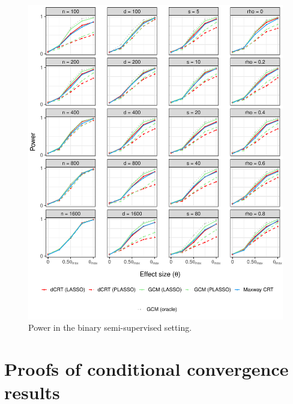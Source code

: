 \documentclass[aos]{imsart}
\theoremstyle{plain}
\theoremstyle{remark}
\begin{document}
\begin{figure}[!ht]
	\centering
	\includegraphics[width = \textwidth]{figures/binomial_semi_supervised_setting_alternative.pdf}
	\caption{Power in the binary semi-supervised setting.}
	\label{fig:binomial_semi-supervised_alternative}
\end{figure}



\clearpage

\section{Proofs of conditional convergence results} \label{sec:conditional-convergence-proofs}
\end{document}
